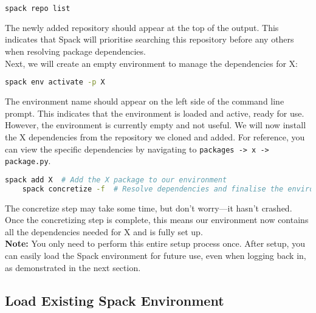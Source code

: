 \documentclass[a4paper,12pt]{article}
\begin{document}
\vspace{1em} 
\begin{lstlisting}[language=bash]   
    spack repo list
\end{lstlisting}
\vspace{1em} 

The newly added repository should appear at the top of the output. This indicates that Spack will prioritise searching this repository before any others when resolving package dependencies. \\

Next, we will create an empty environment to manage the dependencies for X:

\vspace{1em} 
\begin{lstlisting}[language=bash]   
    spack env activate -p X
\end{lstlisting}
\vspace{1em} 

The environment name should appear on the left side of the command line prompt. This indicates that the environment is loaded and active, ready for use. \\

However, the environment is currently empty and not useful. We will now install the X dependencies from the repository we cloned and added. For reference, you can view the specific dependencies by navigating to \texttt{packages -> x -> package.py}.

\vspace{1em} 
\begin{lstlisting}[language=bash]   
    spack add X  # Add the X package to our environment
    spack concretize -f  # Resolve dependencies and finalise the environment setup
\end{lstlisting}
\vspace{1em} 

The concretize step may take some time, but don't worry—it hasn't crashed. Once the concretizing step is complete, this means our environment now contains all the dependencies needed for X and is fully set up. \\

\textbf{Note:} You only need to perform this entire setup process once. After setup, you can easily load the Spack environment for future use, even when logging back in, as demonstrated in the next section.

\subsection{Load Existing Spack Environment}
\end{document}
